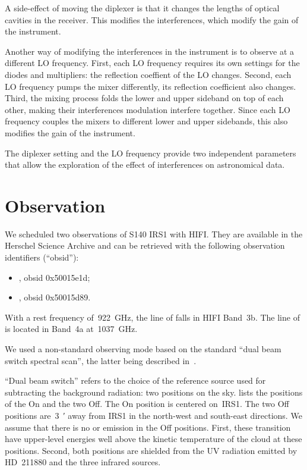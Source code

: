 A side-effect of moving the diplexer is that it changes the lengths of optical cavities in the receiver.
This modifies the interferences, which modify the gain of the instrument.

Another way of modifying the interferences in the instrument is to observe at a different LO frequency.
First, each LO frequency requires its own settings for the diodes and multipliers: the reflection coeffient of the LO changes.
Second, each LO frequency pumps the mixer differently, its reflection coefficient also changes.
Third, the mixing process folds the lower and upper sideband on top of each other, making their interferences modulation interfere together.
Since each LO frequency couples the mixers to different lower and upper sidebands, this also modifies the gain of the instrument.

The diplexer setting and the LO frequency provide two independent parameters that allow the exploration of the effect of interferences on astronomical data.


\FloatBarrier
\section{Observation}

We scheduled two observations of S140 IRS1 with HIFI.
They are available in the Herschel Science Archive and can be retrieved with the following observation identifiers (``obsid''):
\begin{itemize}[noitemsep,nolistsep]
    \item {}, obsid 0x50015e1d;
    \item {}, obsid 0x50015d89.
\end{itemize}

With a rest frequency of~\SI{922}{\giga\hertz}, the line of  falls in HIFI Band~3b.
The line of  is located in Band~4a at~\SI{1037}{\giga\hertz}.

We used a non-standard observing mode based on the standard ``dual beam switch spectral scan'', the latter being described in~\cite{hifiobserversmanual}.

``Dual beam switch'' refers to the choice of the reference source used for subtracting the background radiation: two positions on the sky.
 lists the positions of the On and the two Off.
The On position is centered on~IRS1.
The two Off positions are~\SI{3}{\arcmin} away from IRS1 in the north-west and south-east directions.
We assume that there is no  or  emission in the Off positions.
First, these transition have upper-level energies well above the kinetic temperature of the cloud at these positions.
Second, both positions are shielded from the UV radiation emitted by HD~211880 and the three infrared sources.

